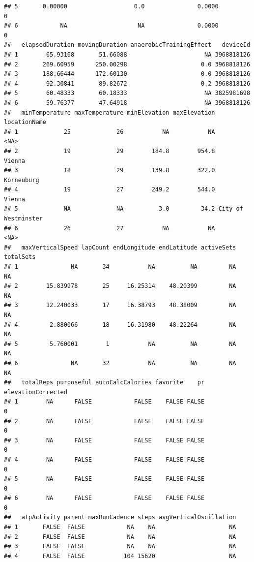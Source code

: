 \documentclass[
]{book}
\begin{document}
\begin{verbatim}
## 5       0.00000                   0.0               0.0000                    0
## 6            NA                    NA               0.0000                    0
##   elapsedDuration movingDuration anaerobicTrainingEffect   deviceId
## 1        65.93168       51.66088                      NA 3968818126
## 2       269.60959      250.00298                     0.0 3968818126
## 3       188.66444      172.60130                     0.0 3968818126
## 4        92.30841       89.82672                     0.2 3968818126
## 5        60.48333       60.18333                      NA 3825981698
## 6        59.76377       47.64918                      NA 3968818126
##   minTemperature maxTemperature minElevation maxElevation        locationName
## 1             25             26           NA           NA                <NA>
## 2             19             29        184.8        954.8              Vienna
## 3             18             29        139.8        322.0          Korneuburg
## 4             19             27        249.2        544.0              Vienna
## 5             NA             NA          3.0         34.2 City of Westminster
## 6             26             27           NA           NA                <NA>
##   maxVerticalSpeed lapCount endLongitude endLatitude activeSets totalSets
## 1               NA       34           NA          NA         NA        NA
## 2        15.839978       25     16.25314    48.20399         NA        NA
## 3        12.240033       17     16.38793    48.38009         NA        NA
## 4         2.880066       18     16.31980    48.22264         NA        NA
## 5         5.760001        1           NA          NA         NA        NA
## 6               NA       32           NA          NA         NA        NA
##   totalReps purposeful autoCalcCalories favorite    pr elevationCorrected
## 1        NA      FALSE            FALSE    FALSE FALSE                  0
## 2        NA      FALSE            FALSE    FALSE FALSE                  0
## 3        NA      FALSE            FALSE    FALSE FALSE                  0
## 4        NA      FALSE            FALSE    FALSE FALSE                  0
## 5        NA      FALSE            FALSE    FALSE FALSE                  0
## 6        NA      FALSE            FALSE    FALSE FALSE                  0
##   atpActivity parent maxRunCadence steps avgVerticalOscillation
## 1       FALSE  FALSE            NA    NA                     NA
## 2       FALSE  FALSE            NA    NA                     NA
## 3       FALSE  FALSE            NA    NA                     NA
## 4       FALSE  FALSE           104 15620                     NA

\end{verbatim}
\end{document}
